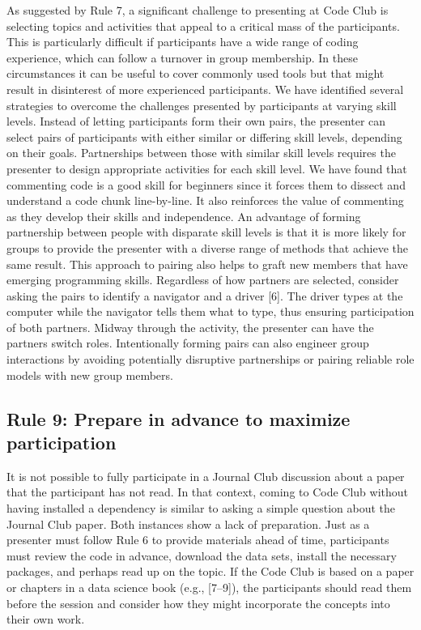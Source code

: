 \documentclass[
  11pt,
]{article}
\begin{document}
As suggested by Rule 7, a significant challenge to presenting at Code
Club is selecting topics and activities that appeal to a critical mass
of the participants. This is particularly difficult if participants have
a wide range of coding experience, which can follow a turnover in group
membership. In these circumstances it can be useful to cover commonly
used tools but that might result in disinterest of more experienced
participants. We have identified several strategies to overcome the
challenges presented by participants at varying skill levels. Instead of
letting participants form their own pairs, the presenter can select
pairs of participants with either similar or differing skill levels,
depending on their goals. Partnerships between those with similar skill
levels requires the presenter to design appropriate activities for each
skill level. We have found that commenting code is a good skill for
beginners since it forces them to dissect and understand a code chunk
line-by-line. It also reinforces the value of commenting as they develop
their skills and independence. An advantage of forming partnership
between people with disparate skill levels is that it is more likely for
groups to provide the presenter with a diverse range of methods that
achieve the same result. This approach to pairing also helps to graft
new members that have emerging programming skills. Regardless of how
partners are selected, consider asking the pairs to identify a navigator
and a driver {[}6{]}. The driver types at the computer while the
navigator tells them what to type, thus ensuring participation of both
partners. Midway through the activity, the presenter can have the
partners switch roles. Intentionally forming pairs can also engineer
group interactions by avoiding potentially disruptive partnerships or
pairing reliable role models with new group members.

\hypertarget{rule-9-prepare-in-advance-to-maximize-participation}{%
\subsection{Rule 9: Prepare in advance to maximize
participation}\label{rule-9-prepare-in-advance-to-maximize-participation}}

It is not possible to fully participate in a Journal Club discussion
about a paper that the participant has not read. In that context, coming
to Code Club without having installed a dependency is similar to asking
a simple question about the Journal Club paper. Both instances show a
lack of preparation. Just as a presenter must follow Rule 6 to provide
materials ahead of time, participants must review the code in advance,
download the data sets, install the necessary packages, and perhaps read
up on the topic. If the Code Club is based on a paper or chapters in a
data science book (e.g., {[}7--9{]}), the participants should read them
before the session and consider how they might incorporate the concepts
into their own work.
\end{document}

